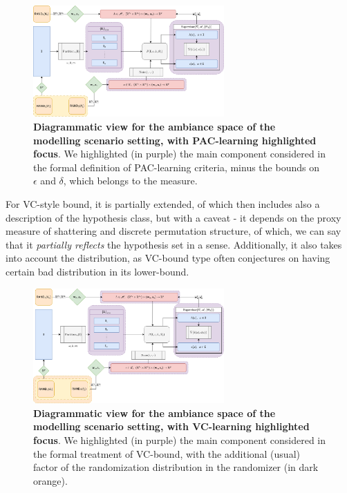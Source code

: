 \documentclass[10pt]{article}
\begin{document}
\begin{figure}[htb]
  \centering
  \includegraphics[width=0.65\textwidth]{media/diagram_2.png}
  \caption{\textbf{Diagrammatic view for the ambiance space of the modelling scenario setting, with PAC-learning highlighted focus}. We highlighted (in purple) the main component considered in the formal definition of PAC-learning criteria, minus the bounds on $\epsilon$ and $\delta$, which belongs to the measure.}
  \label{fig:vapnik_scheme_1}
\end{figure}

For VC-style bound, it is partially extended, of which then includes also a description of the hypothesis class, but with a caveat - it depends on the proxy measure of shattering and discrete permutation structure, of which, we can say that it \textit{partially reflects} the hypothesis set in a sense. Additionally, it also takes into account the distribution, as VC-bound type often conjectures on having certain bad distribution in its lower-bound. 

\begin{figure}[htb]
  \centering
  \includegraphics[width=0.65\textwidth]{media/diagram_3.png}
  \caption{\textbf{Diagrammatic view for the ambiance space of the modelling scenario setting, with VC-learning highlighted focus}. We highlighted (in purple) the main component considered in the formal treatment of VC-bound, with the additional (usual) factor of the randomization distribution in the randomizer (in dark orange).}
  \label{fig:vapnik_scheme_2}
\end{figure}
\end{document}
